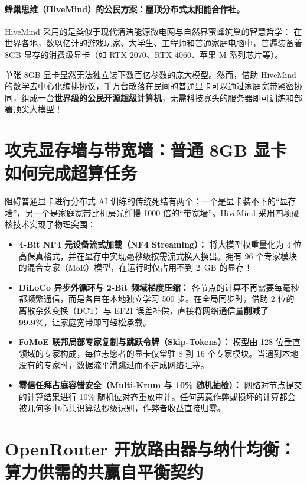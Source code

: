 \documentclass[11pt,a4paper]{report}
\begin{document}
\paragraph{蜂巢思维（HiveMind）的公民方案：屋顶分布式太阳能合作社。}
HiveMind 采用的是类似于现代清洁能源微电网与自然界蜜蜂筑巢的智慧哲学：
在世界各地，数以亿计的游戏玩家、大学生、工程师和普通家庭电脑中，普遍装备着 8GB 显存的消费级显卡（如 RTX 2070、RTX 4060、苹果 M 系列芯片等）。

单张 8GB 显卡显然无法独立装下数百亿参数的庞大模型。然而，借助 HiveMind 的数学去中心化编排协议，千万台散落在民间的普通显卡可以通过家庭宽带紧密协同，组成一台\textbf{世界级的公民开源超级计算机}，无需科技寡头的服务器即可训练和部署顶尖大模型！

\section{攻克显存墙与带宽墙：普通 8GB 显卡如何完成超算任务}

阻碍普通显卡进行分布式 AI 训练的传统死结有两个：一个是显卡装不下的“显存墙”，另一个是家庭宽带比机房光纤慢 1000 倍的“带宽墙”。HiveMind 采用四项硬核技术实现了物理突围：

\begin{itemize}[leftmargin=1.8em]
    \item \textbf{4-Bit NF4 元设备流式加载（NF4 Streaming）：} 将大模型权重量化为 4 位高保真格式，并在显存中实现毫秒级按需流式换入换出。拥有 96 个专家模块的混合专家（MoE）模型，在运行时仅占用不到 2~GB 的显存！
    \item \textbf{DiLoCo 异步外循环与 2-Bit 频域梯度压缩：} 各节点的计算不再需要每毫秒都频繁通信，而是各自在本地独立学习 500 步。在全局同步时，借助 2 位的离散余弦变换（DCT）与 EF21 误差补偿，直接将网络通信量\textbf{削减了 99.9\%}，让家庭宽带即可轻松承载。
    \item \textbf{FoMoE 联邦局部专家复制与跳跃令牌（Skip-Tokens）：} 模型由 128 位垂直领域的专家构成，每位志愿者的显卡仅常驻 8 到 16 个专家模块。当遇到本地没有的专家时，数据流平滑跳过而不造成网络阻塞。
    \item \textbf{零信任拜占庭容错安全（Multi-Krum 与 10\% 随机抽检）：} 网络对节点提交的计算结果进行 10\% 随机位对齐重放审计。任何恶意作弊或损坏的计算都会被几何多中心共识算法秒级识别，作弊者收益直接归零。
\end{itemize}

\section{OpenRouter 开放路由器与纳什均衡：算力供需的共赢自平衡契约}
\end{document}
